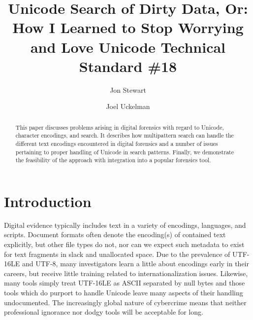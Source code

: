 \documentclass[5p,final,number,sort&compress]{elsarticle}
\begin{document}
\begin{frontmatter}

\title{Unicode Search of Dirty Data, Or:\\ How I Learned to Stop Worrying and Love Unicode Technical Standard \#18}

\author{Jon Stewart}

\author{Joel Uckelman}

\address{Lightbox Technologies, Inc. \\ Arlington, VA}

\begin{abstract}
This paper discusses problems arising in digital forensics with regard to Unicode, character encodings, and search. It describes how multipattern search can handle the different text encodings encountered in digital forensics and a number of issues pertaining to proper handling of Unicode in search patterns. Finally, we demonstrate the feasibility of the approach with integration into a popular forensics tool.
\end{abstract}

\end{frontmatter}

\section{Introduction}

Digital evidence typically includes text in a variety of encodings, languages, and scripts. Document formats often denote the encoding(s) of contained text explicitly, but other file types do not, nor can we expect such metadata to exist for text fragments in slack and unallocated space. Due to the prevalence of UTF-16LE and UTF-8, many investigators learn a little about encodings early in their careers, but receive little training related to internationalization issues. Likewise, many tools simply treat UTF-16LE as ASCII separated by null bytes and those tools which do purport to handle Unicode leave many aspects of their handling undocumented. The increasingly global nature of cybercrime means that neither professional ignorance nor dodgy tools will be acceptable for long.
\end{document}
